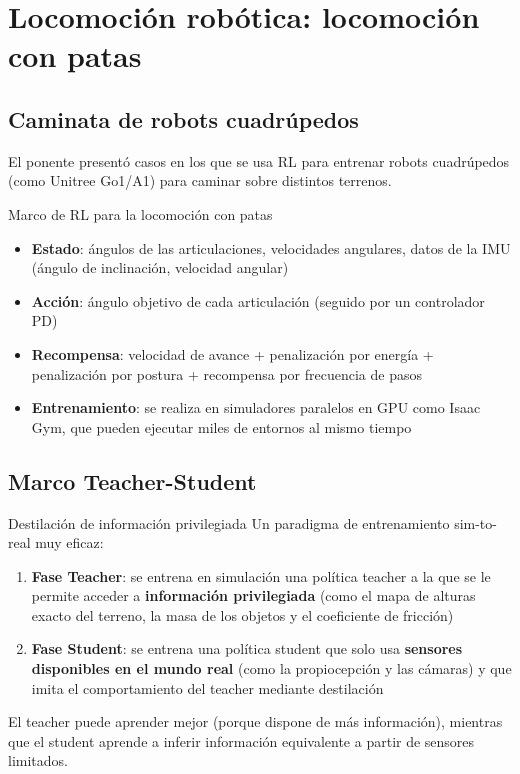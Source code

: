 \section{Locomoción robótica: locomoción con patas}

\subsection{Caminata de robots cuadrúpedos}

El ponente presentó casos en los que se usa RL para entrenar robots cuadrúpedos (como Unitree Go1/A1) para caminar sobre distintos terrenos.

\begin{importantbox}{Marco de RL para la locomoción con patas}
\begin{itemize}
    \item \textbf{Estado}: ángulos de las articulaciones, velocidades angulares, datos de la IMU (ángulo de inclinación, velocidad angular)
    \item \textbf{Acción}: ángulo objetivo de cada articulación (seguido por un controlador PD)
    \item \textbf{Recompensa}: velocidad de avance + penalización por energía + penalización por postura + recompensa por frecuencia de pasos
    \item \textbf{Entrenamiento}: se realiza en simuladores paralelos en GPU como Isaac Gym, que pueden ejecutar miles de entornos al mismo tiempo
\end{itemize}
\end{importantbox}

\subsection{Marco Teacher-Student}

\begin{knowledgebox}{Destilación de información privilegiada}
Un paradigma de entrenamiento sim-to-real muy eficaz:
\begin{enumerate}
    \item \textbf{Fase Teacher}: se entrena en simulación una política teacher a la que se le permite acceder a \textbf{información privilegiada} (como el mapa de alturas exacto del terreno, la masa de los objetos y el coeficiente de fricción)
    \item \textbf{Fase Student}: se entrena una política student que solo usa \textbf{sensores disponibles en el mundo real} (como la propiocepción y las cámaras) y que imita el comportamiento del teacher mediante destilación
\end{enumerate}
El teacher puede aprender mejor (porque dispone de más información), mientras que el student aprende a inferir información equivalente a partir de sensores limitados.
\end{knowledgebox}

